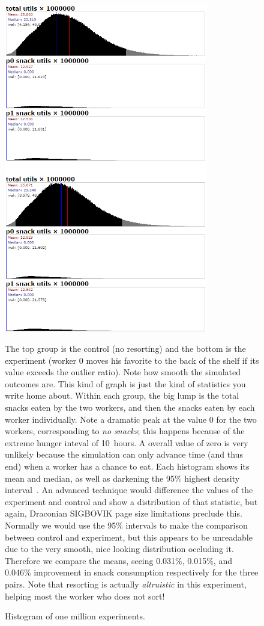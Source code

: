 \documentclass[twocolumn]{article}
\begin{document}
\begin{figure}[p]
\begin{center}
\includegraphics[width=3.5in]{utils}
\end{center}\vspace{-0.1in}
\caption{Histogram of one million experiments.} \label{figure:smooth}
\smallskip
The top group is the
  control (no resorting) and the bottom is the experiment (worker 0
  moves his favorite to the back of the shelf if its value exceeds the
  outlier ratio). Note how smooth the simulated outcomes are. This
  kind of graph is just the kind of statistics you write home about.
  Within each group, the big lump is the total snacks eaten by the two
  workers, and then the snacks eaten by each worker individually. Note
  a dramatic peak at the value 0 for the two workers, corresponding to
  {\it no snacks}; this happens because of the extreme hunger inteval
  of 10~hours. A overall value of zero is very unlikely because the
  simulation can only advance time (and thus end) when a worker has a
  chance to eat. Each histogram shows its mean and median, as well as
  darkening the 95\% highest density
  interval~\cite{kruschke2014doing}. An advanced technique would
  difference the values of the experiment and control and show a
  distribution of that statistic, but again, Draconian SIGBOVIK page
  size limitations preclude this. Normally we would use the 95\%
  intervals to make the comparison between control and experiment, but
  this appears to be unreadable due to the very smooth, nice looking
  distribution occluding it. Therefore we compare the means, seeing
  0.031\%, 0.015\%, and 0.046\% improvement in snack consumption
  respectively for the three pairs. Note that resorting is actually
  {\it altruistic} in this experiment, helping most the worker who does not
  sort! 


\end{figure}
\end{document}
